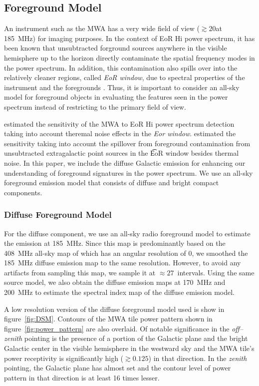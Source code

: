 \documentclass[preprint2,iop,numberedappendix]{emulateapj}
\begin{document}
\subsection{Foreground Model}\label{sec:foreground}

An instrument such as the MWA has a very wide field of view ($\gtrsim 20$\arcdeg at 185~MHz) for imaging purposes. In the context of EoR H{\sc i} power spectrum, it has been known that unsubtracted forground sources anywhere in the visible hemisphere up to the horizon directly contaminate the spatial frequency modes in the power spectrum. In addition, this contamination also spills over into the relatively cleaner regions, called {\it EoR window}, due to spectral properties of the instrument and the foregrounds \citep{thy13,pob13,ved12,par12}. Thus, it is important to consider an all-sky model for foreground objects in evaluating the features seen in the power spectrum instead of restricting to the primary field of view. 

\citet{bea13} estimated the sensitivity of the MWA to EoR H{\sc i} power spectrum detection taking into account theremal noise effects in the {\it Eor window}. \citet{thy13} estimated the sensitivity taking into account the spillover from foreground contamination from unsubtracted extragalactic point sources in the {\t EoR window} besides thermal noise. In this paper, we include the diffuse Galactic emission for enhancing our understanding of foreground signatures in the power spectrum. We use an all-sky foreground emission model that consists of diffuse and bright compact components. 

\subsubsection{Diffuse Foreground Model}\label{sec:DSM}

For the diffuse component, we use an all-sky radio foreground model \citep{deo08} to estimate the emission at 185~MHz. Since this map is predominantly based on the 408~MHz all-sky map of \citet{has82} which has an angular resolution of 0, we smoothed the 185~MHz diffuse emission map to the same resolution. However, to avoid any artifacts from sampling this map, we sample it at $\approx 27$\arcmin~intervals. Using the same source model, we also obtain the diffuse emission maps at 170~MHz and 200~MHz to estimate the spectral index map of the diffuse emission model. 

A low resolution version of the diffuse foreground model used is show in figure~\ref{fig:DSM}. Contours of the MWA tile power pattern shown in figure~\ref{fig:power_pattern} are also overlaid. Of notable significance in the {\it off--zenith} pointing is the presence of a portion of the Galactic plane and the bright Galactic center in the visible hemisphere in the westward sky and the MWA tile's power receptivity is significantly high ($\gtrsim 0.125$) in that direction. In the {\it zenith} pointing, the Galactic plane has almost set and the contour level of power pattern in that direction is at least 16 times lesser. 
\end{document}
